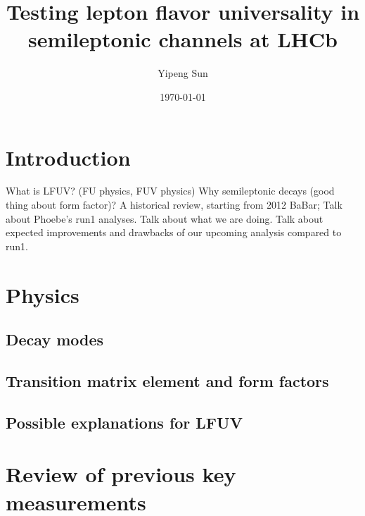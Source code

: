 \documentclass[10pt]{article}
\title{Testing lepton flavor universality in semileptonic channels at LHCb}
\author{Yipeng Sun}
\date{\today}
\begin{document}
\maketitle

\section{Introduction}
What is LFUV? (FU physics, FUV physics)
Why semileptonic decays (good thing about form factor)?
A historical review, starting from 2012 BaBar;
Talk about Phoebe's run1 analyses.
Talk about what we are doing.
Talk about expected improvements and drawbacks of our upcoming analysis compared
to run1.

\section{Physics}
\subsection{Decay modes}


\subsection{Transition matrix element and form factors}


\subsection{Possible explanations for LFUV}



\section{Review of previous key measurements}
\end{document}
